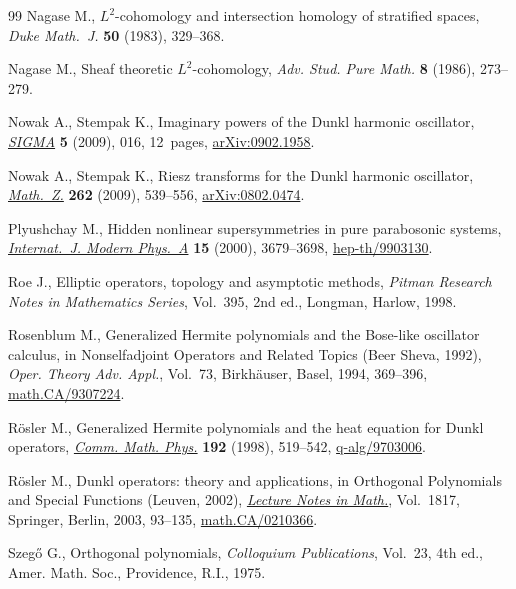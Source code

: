 \begin{thebibliography}{99}
Nagase M., {$L^{2}$}-cohomology and intersection homology of stratif\/ied spaces,
\textit{Duke Math.~J.} \textbf{50} (1983), 329--368.

Nagase M., Sheaf theoretic {$L^2$}-cohomology, \textit{Adv. Stud. Pure Math.}
  \textbf{8} (1986), 273--279.

Nowak A., Stempak K., Imaginary powers of the {D}unkl harmonic oscillator,
  \href{http://dx.doi.org/10.3842/SIGMA.2009.016}{\textit{SIGMA}} \textbf{5} (2009), 016, 12~pages, \href{http://arxiv.org/abs/0902.1958}{arXiv:0902.1958}.

Nowak A., Stempak K., Riesz transforms for the {D}unkl harmonic oscillator,
  \href{http://dx.doi.org/10.1007/s00209-008-0388-4}{\textit{Math.~Z.}} \textbf{262} (2009), 539--556, \href{http://arxiv.org/abs/0802.0474}{arXiv:0802.0474}.

Plyushchay M., Hidden nonlinear supersymmetries in pure parabosonic systems,
  \href{http://dx.doi.org/10.1142/S0217751X0000198X}{\textit{Internat.~J. Modern Phys.~A}} \textbf{15} (2000), 3679--3698,
  \href{http://arxiv.org/abs/hep-th/9903130}{hep-th/9903130}.

Roe J., Elliptic operators, topology and asymptotic methods, \textit{Pitman
  Research Notes in Mathematics Series}, Vol.~395, 2nd ed., Longman, Harlow,
  1998.

Rosenblum M., Generalized {H}ermite polynomials and the {B}ose-like oscillator
  calculus, in Nonselfadjoint Operators and Related Topics ({B}eer {S}heva,
  1992), \textit{Oper. Theory Adv. Appl.}, Vol.~73, Birkh\"auser, Basel, 1994,
  369--396, \href{http://arxiv.org/abs/math.CA/9307224}{math.CA/9307224}.

R{\"o}sler M., Generalized {H}ermite polynomials and the heat equation for
  {D}unkl operators, \href{http://dx.doi.org/10.1007/s002200050307}{\textit{Comm. Math. Phys.}} \textbf{192} (1998), 519--542,
  \href{http://arxiv.org/abs/q-alg/9703006}{q-alg/9703006}.

R{\"o}sler M., Dunkl operators: theory and applications, in Orthogonal
  Polynomials and Special Functions ({L}euven, 2002), \href{http://dx.doi.org/10.1007/3-540-44945-0_3}{\textit{Lecture Notes in
  Math.}}, Vol.~1817, Springer, Berlin, 2003, 93--135,
  \href{http://arxiv.org/abs/math.CA/0210366}{math.CA/0210366}.

Szeg{\H{o}} G., Orthogonal polynomials, \textit{Colloquium Publications},
  Vol.~23, 4th ed., Amer. Math. Soc., Providence, R.I., 1975.


\end{thebibliography}
